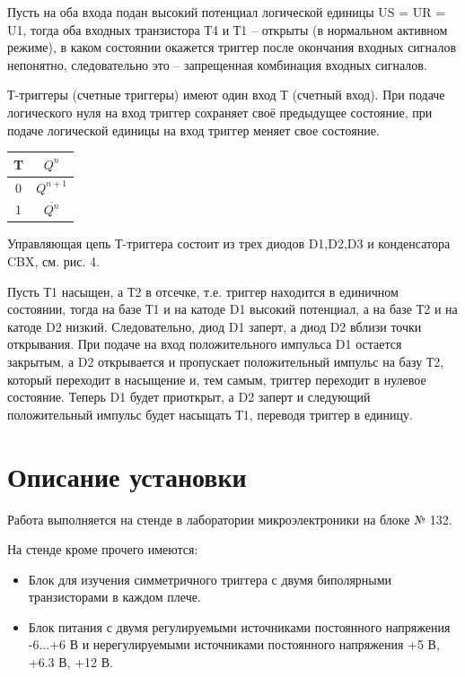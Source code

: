 \documentclass[a4paper,14pt]{article}
\begin{document}
Пусть на оба входа подан высокий потенциал логической единицы US = UR = U1, тогда
оба входных транзистора Т4 и Т1 – открыты (в нормальном активном режиме), в каком
состоянии окажется триггер после окончания входных сигналов непонятно, следовательно
это – запрещенная комбинация входных сигналов.

Т-триггеры (счетные триггеры) имеют один вход Т (счетный вход). При подаче
логического нуля на вход триггер сохраняет своё предыдущее состояние, при подаче
логической единицы на вход триггер меняет свое состояние.

\begin{table}[H]
	\begin{center}
		\begin{tabular}{|c|c|}
			\hline
			T & $Q^{n}$  \\ \hline
			0 & $Q^{n+1}$  \\ \hline
			1 & $\overline{Q^{n}}$ \\ \hline
		\end{tabular}
	\end{center}
\end{table}

Управляющая цепь Т-триггера состоит из трех диодов D1,D2,D3 и конденсатора CBX,
см. рис. 4.

Пусть Т1 насыщен, а Т2 в отсечке, т.е. триггер находится в единичном состоянии,
тогда на базе Т1 и на катоде D1 высокий потенциал, а на базе Т2 и на катоде D2 низкий.
Следовательно, диод D1 заперт, а диод D2 вблизи точки открывания. При подаче на вход
положительного импульса D1 остается закрытым, а D2 открывается и пропускает
положительный импульс на базу Т2, который переходит в насыщение и, тем самым, триггер
переходит в нулевое состояние. Теперь D1 будет приоткрыт, а D2 заперт и следующий
положительный импульс будет насыщать Т1, переводя триггер в единицу.

\section{Описание установки}

Работа выполняется на стенде в лаборатории микроэлектроники на блоке № 132.

На стенде кроме прочего имеются:

\begin{itemize}
	\item Блок для изучения симметричного триггера с двумя биполярными транзисторами в
	каждом плече.
	\item Блок питания с двумя регулируемыми источниками постоянного напряжения
	-6...+6 В и нерегулируемыми источниками постоянного напряжения +5 В, +6.3 В, +12 В.
\end{itemize}
\end{document}
